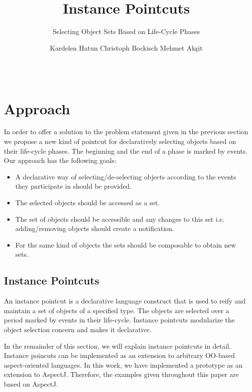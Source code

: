 \documentclass{acm_proc_article-sp}
\begin{document}
\title{Instance Pointcuts}
\subtitle{Selecting Object Sets Based on Life-Cycle Phases}

\author{
\alignauthor
Kardelen Hatun \hspace{2cm} Christoph Bockisch \hspace{2cm} Mehmet Ak\c{s}it\\
\\
\\
}




\section{Approach}
\label{sect:approach}
In order to offer a solution to the problem statement given in the previous section we propose a new kind of pointcut for declaratively selecting objects based on their life-cycle phases. The beginning and the end of a phase is marked by events. Our approach has the following goals:

\begin{itemize}
\item A declarative way of selecting/de-selecting objects according to the events they participate in should be provided.
\item The selected objects should be accessed as a set.
\item The set of objects should be accessible and any changes to this set i.e. adding/removing objects should create a notification.
\item For the same kind of objects the sets should be composable to obtain new sets.
\end{itemize}

\subsection{Instance Pointcuts}
\label{sect:ip}
An instance pointcut is a declarative language construct that is used to reify and maintain a set of objects of a specified type. The objects are selected over a period marked by events in their life-cycle. Instance pointcuts modularize the object selection concern and makes it declarative. 
 
In the remainder of this section, we will explain instance pointcuts in detail. Instance poincuts can be implemented as an extension to arbitrary OO-based aspect-oriented languages. In this work, we have implemented a prototype as an extension to AspectJ. Therefore, the examples given throughout this paper are based on AspectJ.
\end{document}
